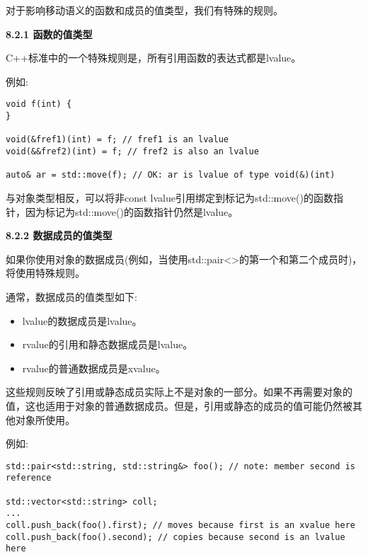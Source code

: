 对于影响移动语义的函数和成员的值类型，我们有特殊的规则。\par

\hspace*{\fill} \par %
\textbf{8.2.1 函数的值类型}

C++标准中的一个特殊规则是，所有引用函数的表达式都是lvalue。\par

例如:\par

\begin{lstlisting}[caption={}]
void f(int) {
}

void(&fref1)(int) = f; // fref1 is an lvalue
void(&&fref2)(int) = f; // fref2 is also an lvalue

auto& ar = std::move(f); // OK: ar is lvalue of type void(&)(int)
\end{lstlisting}

与对象类型相反，可以将非const lvalue引用绑定到标记为std::move()的函数指针，因为标记为std::move()的函数指针仍然是lvalue。\par

\hspace*{\fill} \par %
\textbf{8.2.2 数据成员的值类型}

如果你使用对象的数据成员(例如，当使用std::pair<>的第一个和第二个成员时)，将使用特殊规则。\par

通常，数据成员的值类型如下:\par

\begin{itemize}
	\item lvalue的数据成员是lvalue。
	\item rvalue的引用和静态数据成员是lvalue。
	\item rvalue的普通数据成员是xvalue。
\end{itemize}

这些规则反映了引用或静态成员实际上不是对象的一部分。如果不再需要对象的值，这也适用于对象的普通数据成员。但是，引用或静态的成员的值可能仍然被其他对象所使用。\par

例如:\par

\begin{lstlisting}[caption={}]
std::pair<std::string, std::string&> foo(); // note: member second is reference

std::vector<std::string> coll;
...
coll.push_back(foo().first); // moves because first is an xvalue here
coll.push_back(foo().second); // copies because second is an lvalue here
\end{lstlisting}

